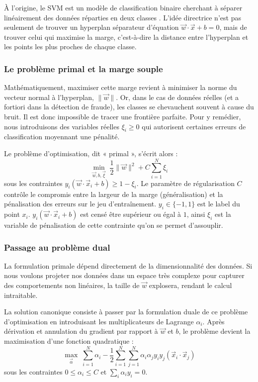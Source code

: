 \documentclass[a4paper]{article}
\begin{document}
À l'origine, le SVM est un modèle de classification binaire cherchant à séparer linéairement des données réparties en deux classes \cite{cortes1995svm}. L'idée directrice n'est pas seulement de trouver un hyperplan séparateur d'équation $\vec{w} \cdot \vec{x} + b = 0$, mais de trouver celui qui maximise la marge, c'est-à-dire la distance entre l'hyperplan et les points les plus proches de chaque classe.

\subsubsection*{Le problème primal et la marge souple}

Mathématiquement, maximiser cette marge revient à minimiser la norme du vecteur normal à l'hyperplan, $\|\vec{w}\|$. Or, dans le cas de données réelles (et a fortiori dans la détection de fraude), les classes se chevauchent souvent à cause du bruit. Il est donc impossible de tracer une frontière parfaite. Pour y remédier, nous introduisons des variables réelles $\xi_i \geq 0$ qui autorisent certaines erreurs de classification moyennant une pénalité. 

Le problème d'optimisation, dit « primal », s'écrit alors :
\[
\min_{\vec{w}, b, \vec{\xi}} \;\frac{1}{2} \|\vec{w}\|^2 + C \sum_{i=1}^{N} \xi_i
\]
sous les contraintes $y_i(\vec{w} \cdot \vec{x}_i + b) \geq 1 - \xi_i$. Le paramètre de régularisation $C$ contrôle le compromis entre la largeur de la marge (généralisation) et la pénalisation des erreurs sur le jeu d'entraînement. $y_i \in \{-1, 1\}$ est le label du point $x_i$. $y_i(\vec{w} \cdot \vec{x}_i + b)$ est censé être supérieur ou égal à $1$, ainsi $\xi_i$ est la variable de pénalisation de cette contrainte qu'on se permet d'assouplir. 

\subsubsection*{Passage au problème dual}

La formulation primale dépend directement de la dimensionnalité des données. Si nous voulons projeter nos données dans un espace très complexe pour capturer des comportements non linéaires, la taille de $\vec{w}$ explosera, rendant le calcul intraitable. 

La solution canonique consiste à passer par la formulation duale de ce problème d'optimisation en introduisant les multiplicateurs de Lagrange $\alpha_i$. Après dérivation et annulation du gradient par rapport à $\vec{w}$ et $b$, le problème devient la maximisation d'une fonction quadratique :
\[
\max_{\vec{\alpha}} \; \sum_{i=1}^{N} \alpha_i - \frac{1}{2} \sum_{i=1}^{N} \sum_{j=1}^{N} \alpha_i \alpha_j y_i y_j (\vec{x}_i \cdot \vec{x}_j)
\]
sous les contraintes $0 \leq \alpha_i \leq C$ et $\sum_{i} \alpha_i y_i = 0$.
\end{document}
